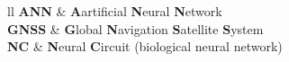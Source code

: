 
\begin{abbreviations}{ll} %
	\textbf{ANN} & \textbf{A}artificial \textbf{N}eural \textbf{N}etwork\\
	\textbf{GNSS} & \textbf{G}lobal \textbf{N}avigation \textbf{S}atellite \textbf{S}ystem\\
	\textbf{NC} & \textbf{N}eural \textbf{C}ircuit (biological neural network)\\
\end{abbreviations}
